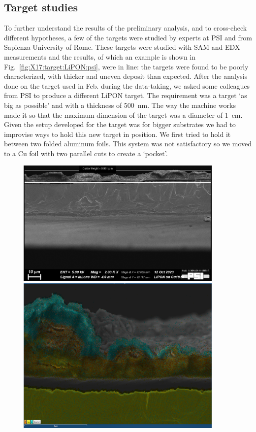 \begin{refsection}
    \section{Target studies}
        To further understand the results of the preliminary analysis, and to cross-check different hypotheses, a few of the targets were studied by experts at PSI and from Sapienza University of Rome.
        These targets were studied with SAM and EDX measurements and the results, of which an example is shown in Fig.~\ref{fig:X17:target:LiPON:psi}, were in line: the targets were found to be poorly characterized, with thicker and uneven deposit than expected.
        After the analysis done on the target used in Feb. during the data-taking, we asked some colleagues from PSI to produce a different LiPON target.
        The requirement was a target `as big as possible' and with a thickness of \SI{500}{\nano m}.
        The way the machine works made it so that the maximum dimension of the target was a diameter of \SI{1}{cm}.
        Given the setup developed for the target was for bigger substrates we had to improvise ways to hold this new target in position.
        We first tried to hold it between two folded aluminum foils. 
        This system was not satisfactory so we moved to a Cu foil with two parallel cuts to create a `pocket'.
        \begin{figure}
            \centering
            \includegraphics[width = 0.9\textwidth]{Figures/X17/PSI_LiPON_picture.png}
            \includegraphics[width = 0.9\textwidth]{Figures/X17/PSI_LiPON-atoms_picture.PNG}

\end{figure}
\end{refsection}
